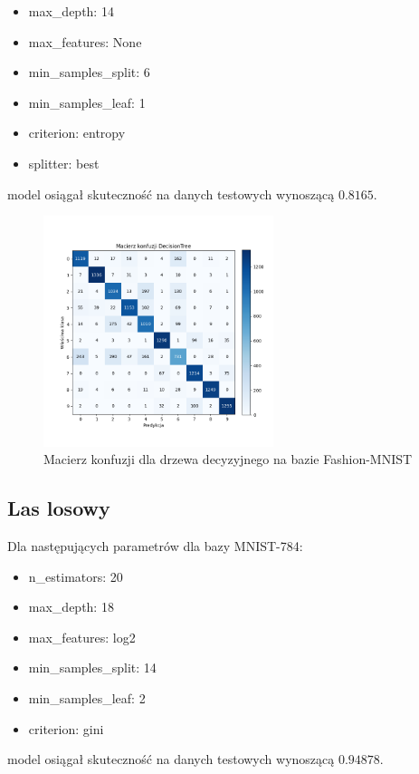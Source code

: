 \documentclass{article}
\begin{document}
\begin{itemize}
    \item max\_depth: 14
    \item max\_features: None
    \item min\_samples\_split: 6
    \item min\_samples\_leaf: 1
    \item criterion: entropy
    \item splitter: best
\end{itemize}

model osiągał skuteczność na danych testowych wynoszącą $0.8165$.

\begin{figure}[H]
    \centering
    \includegraphics[width=0.6\textwidth]{../Saves/Trees/fashion-mnist/DecisionTree_fashion-mnist_conf_mat.png}
    \caption{Macierz konfuzji dla drzewa decyzyjnego na bazie Fashion-MNIST}
\end{figure}

\subsection{Las losowy}

Dla następujących parametrów dla bazy MNIST-784:

\begin{itemize}
    \item n\_estimators: 20
    \item max\_depth: 18
    \item max\_features: log2
    \item min\_samples\_split: 14
    \item min\_samples\_leaf: 2
    \item criterion: gini
\end{itemize}
model osiągał skuteczność na danych testowych wynoszącą $0.94878$.
\end{document}
